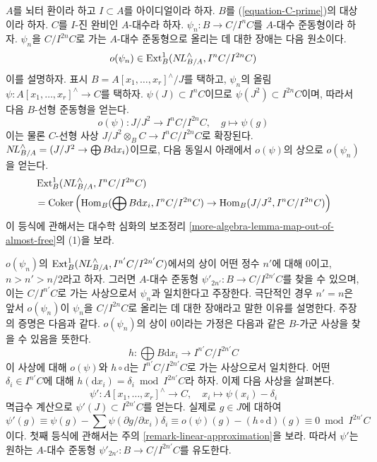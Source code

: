 \begin{remark}[사상의 올림]
\label{remark-improve-homomorphism}
$A$를 뇌터 환이라 하고 $I \subset A$를 아이디얼이라 하자.
$B$를 (\ref{equation-C-prime})의 대상이라 하자.
$C$를 $I$-진 완비인 $A$-대수라 하자.
$\psi_n : B \to C/I^nC$를 $A$-대수 준동형이라 하자.
$\psi_n$을 $C/I^{2n}C$로 가는 $A$-대수 준동형으로 올리는 데 대한 장애는
다음 원소이다.
$$
o(\psi_n) \in \mathop{\mathrm{Ext}}\nolimits^1_B(\mathop{N\!L}\nolimits_{B/A}^\wedge, I^nC/I^{2n}C)
$$
이를 설명하자. 표시 $B = A[x_1, \ldots, x_r]^\wedge/J$를 택하고,
$\psi_n$의 올림 $\psi : A[x_1, \ldots, x_r]^\wedge \to C$를 택하자.
$\psi(J) \subset I^nC$이므로 $\psi(J^2) \subset I^{2n}C$이며,
따라서 다음 $B$-선형 준동형을 얻는다.
$$
o(\psi) :
J/J^2 \longrightarrow I^nC/I^{2n}C, \quad g \longmapsto \psi(g)
$$
이는 물론 $C$-선형 사상 $J/J^2 \otimes_B C \to I^nC/I^{2n}C$로 확장된다.
$\mathop{N\!L}\nolimits_{B/A}^\wedge = (J/J^2 \to \bigoplus B \text{d}x_i)$이므로,
다음 동일시 아래에서 $o(\psi)$의 상으로 $o(\psi_n)$을 얻는다.
\begin{align*}
& \mathop{\mathrm{Ext}}\nolimits^1_B(\mathop{N\!L}\nolimits_{B/A}^\wedge, I^nC/I^{2n}C) \\
& =
\mathop{\mathrm{Coker}}\left(\mathop{\mathrm{Hom}}\nolimits_B(\bigoplus B\text{d}x_i, I^nC/I^{2n}C) \to
\mathop{\mathrm{Hom}}\nolimits_B(J/J^2, I^nC/I^{2n}C)\right)
\end{align*}
이 등식에 관해서는 대수학 심화의 보조정리
\ref{more-algebra-lemma-map-out-of-almost-free}의 (1)을 보라.

\medskip\noindent
$o(\psi_n)$의 $\mathop{\mathrm{Ext}}\nolimits^1_B(\mathop{N\!L}\nolimits_{B/A}^\wedge, I^{n'}C/I^{2n'}C)$에서의 상이
어떤 정수 $n'$에 대해 0이고, $n > n' > n/2$라고 하자.
그러면 $A$-대수 준동형 $\psi'_{2n'} : B \to C/I^{2n'}C$를 찾을 수 있으며,
이는 $C/I^{n'}C$로 가는 사상으로서 $\psi_n$과 일치한다고 주장한다.
극단적인 경우 $n' = n$은 앞서 $o(\psi_n)$이
$\psi_n$을 $C/I^{2n}C$로 올리는 데 대한 장애라고 말한 이유를 설명한다.
주장의 증명은 다음과 같다. $o(\psi_n)$의 상이 0이라는 가정은
다음과 같은 $B$-가군 사상을 찾을 수 있음을 뜻한다.
$$
h : \bigoplus B\text{d}x_i \longrightarrow I^{n'}C/I^{2n'}C
$$
이 사상에 대해 $o(\psi)$와 $h \circ \text{d}$는
$I^{n'}C/I^{2n'}C$로 가는 사상으로서 일치한다.
어떤 $\delta_i \in I^{n'}C$에 대해
$h(\text{d}x_i) = \delta_i \bmod I^{2n'}C$라 하자. 이제 다음 사상을 살펴본다.
$$
\psi' : A[x_1, \ldots, x_r]^\wedge \to C,\quad
x_i \longmapsto \psi(x_i) - \delta_i
$$
멱급수 계산으로 $\psi'(J) \subset I^{2n'}C$를 얻는다.
실제로 $g \in J$에 대하여
$$
\psi'(g) \equiv
\psi(g) - \sum \psi(\partial g/\partial x_i)\delta_i \equiv
o(\psi)(g) - (h \circ \text{d})(g) \equiv
0 \bmod I^{2n'}C
$$
이다. 첫째 등식에 관해서는 주의 \ref{remark-linear-approximation}을 보라.
따라서 $\psi'$는 원하는 $A$-대수 준동형
$\psi'_{2n'} : B \to C/I^{2n'}C$를 유도한다.
\end{remark}

